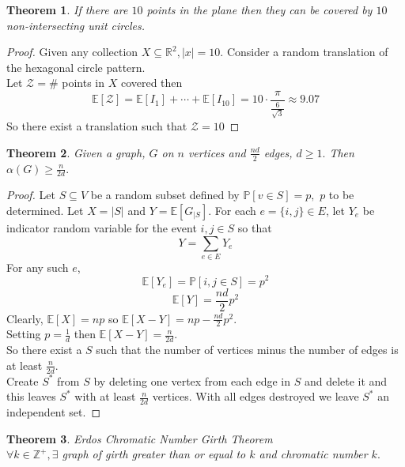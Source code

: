 \documentclass[a4paper]{article}
\newtheorem{thm}{Theorem}[section]
\begin{document}
\begin{thm}
    If there are $10$ points in the plane then they can be covered by $10$ non-intersecting unit circles.
\end{thm}
\begin{proof}
    Given any collection $X\subseteq \mathbb{R}^2,|x|=10$. Consider a random translation of the hexagonal circle pattern.\\
    Let $\mathcal{Z}=\#$ points in $X$ covered then $$\mathbb{E}[\mathcal{Z}]=\mathbb{E}[I_1]+\cdots+\mathbb{E}[I_{10}]=10\cdot \frac{\pi}{\frac{6}{\sqrt{3}}}\approx 9.07$$
    So there exist a translation such that $\mathcal{Z}=10$
\end{proof}
\begin{thm}
    Given a graph, $G$ on $n$ vertices and $\frac{nd}{2}$ edges, $d\geq 1.$ Then $\alpha(G)\geq \frac{n}{2d}.$
\end{thm}
\begin{proof}
    Let $S\subseteq V$ be a random subset defined by $\mathbb{P}[v\in S]=p,$ $p$ to be determined. Let $X=|S|$ and $Y=\mathbb{E}[G_{|S}].$ For each $e=\{i,j\}\in E$, let $Y_e$ be indicator random variable for the event $i,j\in S$ so that $$Y=\sum_{e\in E}Y_e$$ For any such $e$, $$\mathbb{E}[Y_e]=\mathbb{P}[i,j\in S]=p^2$$
    $$\mathbb{E}[Y]=\frac{nd}{2}p^2$$
    Clearly, $\mathbb{E}[X]=np$ so $\mathbb{E}[X-Y]=np-\frac{nd}{2}p^2.$ \\
    Setting $p=\frac{1}{d}$ then $\mathbb{E}[X-Y]=\frac{n}{2d}.$ \\
    So there exist a $S$ such that the number of vertices minus the number of edges is at least $\frac{n}{2d}.$\\
    Create $S^*$ from $S$ by deleting one vertex from each edge in $S$ and delete it and this leaves $S^*$ with at least $\frac{n}{2d}$ vertices. With all edges destroyed we leave $S^*$ an independent set.
\end{proof}
\begin{thm}
    Erdos Chromatic Number Girth Theorem\\
    $\forall k\in \mathbb{Z}^+, \exists $ graph of girth greater than or equal to $k$ and chromatic number $k.$
\end{thm}
\end{document}
